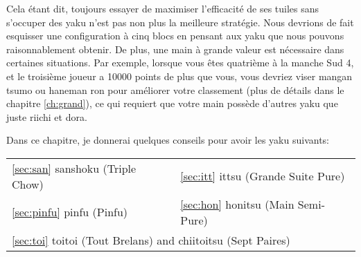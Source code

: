 \bigskip
Cela étant dit, toujours essayer de maximiser l'efficacité de ses tuiles sans s'occuper des {\jap yaku} n'est pas non plus la meilleure stratégie. Nous devrions de fait esquisser une configuration à cinq blocs en pensant aux {\jap yaku} que nous pouvons raisonnablement obtenir. De plus, une main à grande valeur est nécessaire dans certaines situations. Par exemple, lorsque vous êtes quatrième à la manche Sud 4, et le troisième joueur a 10000 points de plus que vous, vous devriez viser {\jap mangan tsumo} ou {\jap haneman ron} pour améliorer votre classement (plus de détails dans le chapitre \ref{ch:grand}), ce qui requiert que votre main possède d'autres {\jap yaku} que juste riichi et {\jap dora}.

\bigskip
Dans ce chapitre, je donnerai quelques conseils pour avoir les {\jap yaku} suivants:
\bigskip

\begin{tabular}{l l}
	\ref{sec:san} {\jap sanshoku} (Triple Chow) & \ref{sec:itt} {\jap ittsu} (Grande Suite Pure)\\
	\ref{sec:pinfu} {\jap pinfu} (Pinfu) & \ref{sec:hon} {\jap honitsu} (Main Semi-Pure)\\
	\multicolumn{2}{l}{\ref{sec:toi} {\jap toitoi} (Tout Brelans) and {\jap chiitoitsu} (Sept Paires)}
\end{tabular}


